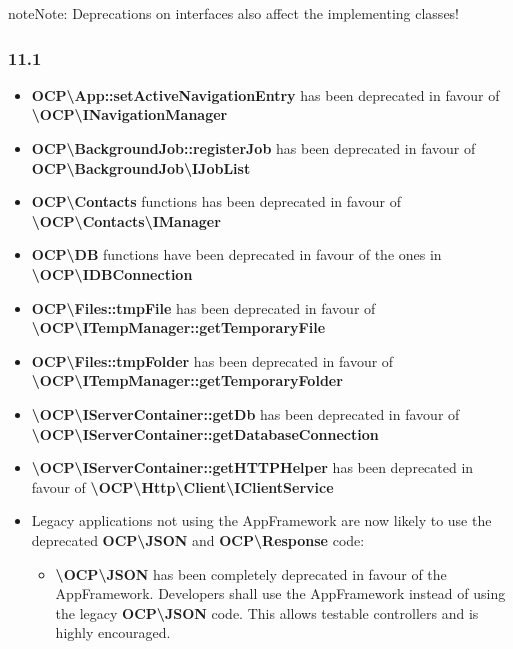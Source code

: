\documentclass[letterpaper,10pt,english]{sphinxmanual}
\begin{document}
\begin{notice}{note}{Note:}
Deprecations on interfaces also affect the implementing classes!
\end{notice}


\subsubsection{11.1}
\label{app/changelog:id1}\begin{itemize}
\item {} 
\textbf{OCP\textbackslash{}App::setActiveNavigationEntry} has been deprecated in favour of \textbf{\textbackslash{}OCP\textbackslash{}INavigationManager}

\item {} 
\textbf{OCP\textbackslash{}BackgroundJob::registerJob} has been deprecated in favour of \textbf{OCP\textbackslash{}BackgroundJob\textbackslash{}IJobList}

\item {} 
\textbf{OCP\textbackslash{}Contacts} functions has been deprecated in favour of \textbf{\textbackslash{}OCP\textbackslash{}Contacts\textbackslash{}IManager}

\item {} 
\textbf{OCP\textbackslash{}DB} functions have been deprecated in favour of the ones in \textbf{\textbackslash{}OCP\textbackslash{}IDBConnection}

\item {} 
\textbf{OCP\textbackslash{}Files::tmpFile} has been deprecated in favour of \textbf{\textbackslash{}OCP\textbackslash{}ITempManager::getTemporaryFile}

\item {} 
\textbf{OCP\textbackslash{}Files::tmpFolder} has been deprecated in favour of \textbf{\textbackslash{}OCP\textbackslash{}ITempManager::getTemporaryFolder}

\item {} 
\textbf{\textbackslash{}OCP\textbackslash{}IServerContainer::getDb} has been deprecated in favour of \textbf{\textbackslash{}OCP\textbackslash{}IServerContainer::getDatabaseConnection}

\item {} 
\textbf{\textbackslash{}OCP\textbackslash{}IServerContainer::getHTTPHelper} has been deprecated in favour of \textbf{\textbackslash{}OCP\textbackslash{}Http\textbackslash{}Client\textbackslash{}IClientService}

\item {} 
Legacy applications not using the AppFramework are now likely to use the deprecated \textbf{OCP\textbackslash{}JSON} and \textbf{OCP\textbackslash{}Response} code:
\begin{itemize}
\item {} 
\textbf{\textbackslash{}OCP\textbackslash{}JSON} has been completely deprecated in favour of the AppFramework. Developers shall use the AppFramework instead of using the legacy \textbf{OCP\textbackslash{}JSON} code. This allows testable controllers and is highly encouraged.


\end{itemize}
\end{itemize}
\end{document}
